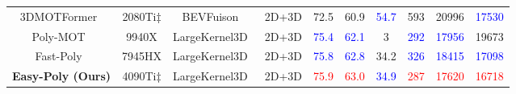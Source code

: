 \begin{table*}
{\begin{tabular}{cccc|ccc|ccc}
                                   3DMOTFormer~\cite{ding20233dmotformer}& 2080Ti$\ddagger$       & BEVFuison~\cite{liu2023bevfusion}       & 2D+3D      & 72.5      & 60.9     & \textcolor{blue}{54.7}    & 593    & 20996   & \textcolor{blue}{17530}   \\  
                                   Poly-MOT~\cite{li2023poly}               & 9940X       & LargeKernel3D~\cite{chen2022scaling}         &2D+3D       & \textcolor{blue}{75.4}      & \textcolor{blue}{62.1}     & 3    & \textcolor{blue}{292}    & \textcolor{blue}{17956}   & 19673   \\ 
                                  Fast-Poly~\cite{li2024fast}               & 7945HX       & LargeKernel3D~\cite{chen2022scaling}         &2D+3D       & \textcolor{blue}{75.8}      & \textcolor{blue}{62.8}     & 34.2    & \textcolor{blue}{326}    & \textcolor{blue}{18415}   &  \textcolor{blue}{17098}  \\ \midrule

                                  \textbf{Easy-Poly (Ours)}               & 4090Ti$\ddagger$       & LargeKernel3D~\cite{chen2022scaling}         &2D+3D       &  \textcolor{red}{75.9}      & \textcolor{red}{63.0}     & \textcolor{blue}{34.9}    & \textcolor{red}{287}    & \textcolor{red}{17620}   &   \textcolor{red}{16718}  \\
        \bottomrule
        \end{tabular}}
 \end{table*}


